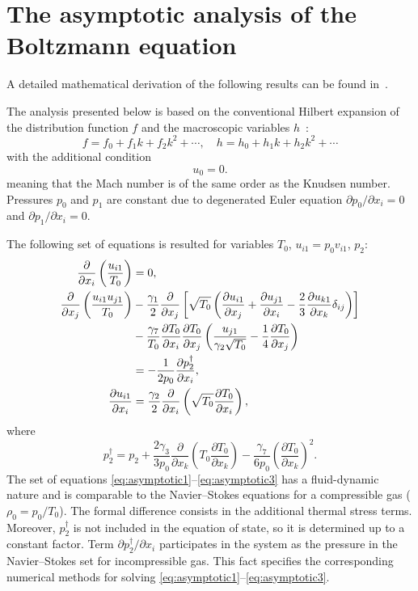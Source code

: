 \documentclass[smallextended, referee]{svjour3} %
\newcommand{\pder}[2][]{\frac{\partial#1}{\partial#2}}
\newcommand{\Pder}[2][]{\partial#1/\partial#2}
\begin{document}
\section{The asymptotic analysis of the Boltzmann equation}

A detailed mathematical derivation of the following results can be found in~\cite{Sone2002, Sone2007}.

The analysis presented below is based on the conventional Hilbert expansion
of the distribution function \(f\) and the macroscopic variables \(h\)~\cite{Hilbert1912}:
\[ f = f_0 + f_1k + f_2k^2 + \cdots, \quad h = h_0 + h_1k + h_2k^2 + \cdots \]
with the additional condition
\begin{equation}\label{eq:Mach_constraint}
	u_0 = 0.
\end{equation}
meaning that the Mach number is of the same order as the Knudsen number.
Pressures \(p_0\) and \(p_1\) are constant due to degenerated Euler equation
\(\Pder[p_0]{x_i} = 0 \) and \(\Pder[p_1]{x_i} = 0 \).

The following set of equations is resulted for variables \(T_0\), \(u_{i1} = p_0v_{i1}\), \(p_2\):
\begin{align}
	\pder{x_i}\left(\frac{u_{i1}}{T_0}\right) &= 0, \label{eq:asymptotic1} \\
	\pder{x_j}\left(\frac{u_{i1}u_{j1}}{T_0}\right)
		&-\frac{\gamma_1}2\pder{x_j}\left[\sqrt{T_0}\left(
			\pder[u_{i1}]{x_j}+\pder[u_{j1}]{x_i}-\frac23\pder[u_{k1}]{x_k}\delta_{ij}\right
		)\right] \notag\\
		&- \frac{\gamma_7}{T_0}\pder[T_0]{x_i}\pder[T_0]{x_j}\left(\frac{u_{j1}}{\gamma_2\sqrt{T_0}} - \frac{1}4\pder[T_0]{x_j}\right) \notag\\
		&= -\frac1{2p_0}\pder[p_2^\dag]{x_i}, \label{eq:asymptotic2} \\
	\pder[u_{i1}]{x_i} &= \frac{\gamma_2}2\pder{x_i}\left(\sqrt{T_0}\pder[T_0]{x_i}\right), \label{eq:asymptotic3}
\end{align}
where
\[ 
	p_2^\dag = p_2 + 
		\frac{2\gamma_3}{3p_0}\pder{x_k}\left(T_0\pder[T_0]{x_k}\right) -
		\frac{\gamma_7}{6p_0}\left(\pder[T_0]{x_k}\right)^2.
\]
The set of equations \eqref{eq:asymptotic1}--\eqref{eq:asymptotic3} has a fluid-dynamic nature
and is comparable to the Navier--Stokes equations for a compressible gas (\(\rho_0 = p_0/T_0\)).
The formal difference consists in the additional thermal stress terms.
Moreover, \(p_2^\dag\) is not included in the equation of state,
so it is determined up to a constant factor.
Term \(\partial{p_2 ^ \dag} / \partial{x_i}\) participates in the system as the pressure
in the Navier--Stokes set for incompressible gas.
This fact specifies the corresponding numerical methods for solving \eqref{eq:asymptotic1}--\eqref{eq:asymptotic3}.
\end{document}
